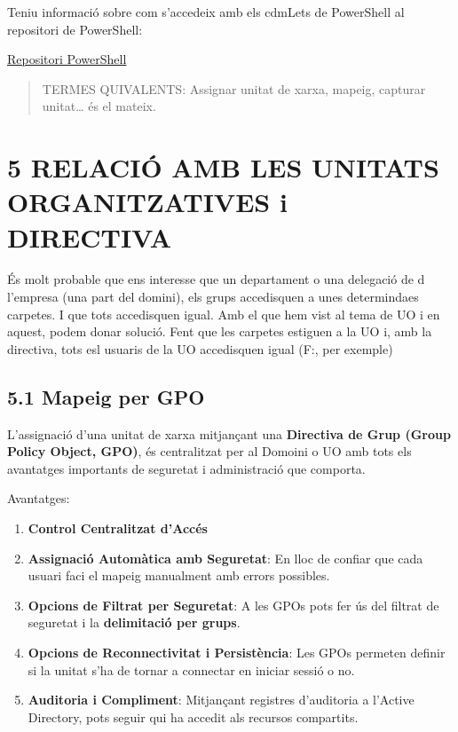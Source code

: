 \documentclass[
  a4paper,
]{article}
\begin{document}
Teniu informació sobre com s'accedeix amb els cdmLets de PowerShell al
repositori de PowerShell:

\href{https://github.com/tofermos/PowerShell/blob/main/md/PSCompartirRecursos.md}{Repositori
PowerShell}

\begin{quote}
TERMES QUIVALENTS: Assignar unitat de xarxa, mapeig, capturar
unitat\ldots{} és el mateix.
\end{quote}

\section{5 RELACIÓ AMB LES UNITATS ORGANITZATIVES i
DIRECTIVA}\label{relaciuxf3-amb-les-unitats-organitzatives-i-directiva}

És molt probable que ens interesse que un departament o una delegació de
d l'empresa (una part del domini), els grups accedisquen a unes
determindaes carpetes. I que tots accedisquen igual. Amb el que hem vist
al tema de UO i en aquest, podem donar solució. Fent que les carpetes
estiguen a la UO i, amb la directiva, tots esl usuaris de la UO
accedisquen igual (F:, per exemple)

\subsection{5.1 Mapeig per GPO}\label{mapeig-per-gpo}

L'assignació d'una unitat de xarxa mitjançant una \textbf{Directiva de
Grup (Group Policy Object, GPO)}, és centralitzat per al Domoini o UO
amb tots els avantatges importants de seguretat i administració que
comporta.

Avantatges:

\begin{enumerate}
\def\labelenumi{\arabic{enumi}.}
\item
  \textbf{Control Centralitzat d'Accés}
\item
  \textbf{Assignació Automàtica amb Seguretat}: En lloc de confiar que
  cada usuari faci el mapeig manualment amb errors possibles.
\item
  \textbf{Opcions de Filtrat per Seguretat}: A les GPOs pots fer ús del
  filtrat de seguretat i la \textbf{delimitació per grups}.
\item
  \textbf{Opcions de Reconnectivitat i Persistència}: Les GPOs permeten
  definir si la unitat s'ha de tornar a connectar en iniciar sessió o
  no.
\item
  \textbf{Auditoria i Compliment}: Mitjançant registres d'auditoria a
  l'Active Directory, pots seguir qui ha accedit als recursos
  compartits.
\end{enumerate}
\end{document}
